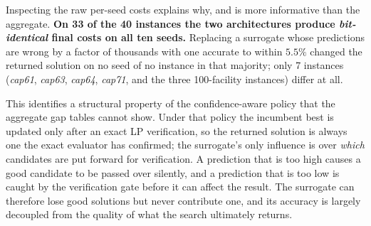 \documentclass[conference]{IEEEtran}
\begin{document}
Inspecting the raw per-seed costs explains why, and is more informative than
the aggregate. \textbf{On 33 of the 40 instances the two architectures produce
\emph{bit-identical} final costs on all ten seeds.} Replacing a surrogate whose
predictions are wrong by a factor of thousands with one accurate to within
$5.5\%$ changed the returned solution on no seed of no instance in that
majority; only 7 instances (\emph{cap61}, \emph{cap63}, \emph{cap64},
\emph{cap71}, and the three 100-facility instances) differ at all.

This identifies a structural property of the confidence-aware policy that the
aggregate gap tables cannot show. Under that policy the incumbent best is
updated only after an exact LP verification, so the returned solution is always
one the exact evaluator has confirmed; the surrogate's only influence is over
\emph{which} candidates are put forward for verification. A prediction that is
too high causes a good candidate to be passed over silently, and a prediction
that is too low is caught by the verification gate before it can affect the
result. The surrogate can therefore lose good solutions but never contribute
one, and its accuracy is largely decoupled from the quality of what the search
ultimately returns.
\end{document}
